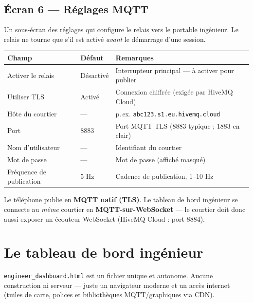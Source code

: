 \documentclass[11pt,a4paper,oneside]{report}
\newcommand{\code}[1]{\texttt{#1}}
\begin{document}
\subsection{Écran 6 --- Réglages MQTT}
Un sous-écran des réglages qui configure le relais vers le portable ingénieur. Le
relais ne tourne que s'il est activé \emph{avant} le démarrage d'une session.

\begin{tabularx}{\linewidth}{@{}llL@{}}
\toprule
\textbf{Champ} & \textbf{Défaut} & \textbf{Remarques}\\
\midrule
Activer le relais & Désactivé & Interrupteur principal --- à activer pour publier\\
Utiliser TLS & Activé & Connexion chiffrée (exigée par HiveMQ Cloud)\\
Hôte du courtier & --- & p.\,ex. \code{abc123.s1.eu.hivemq.cloud}\\
Port & 8883 & Port MQTT TLS (8883 typique ; 1883 en clair)\\
Nom d'utilisateur & --- & Identifiant du courtier\\
Mot de passe & --- & Mot de passe (affiché masqué)\\
Fréquence de publication & 5 Hz & Cadence de publication, 1--10 Hz\\
\bottomrule
\end{tabularx}
\begin{tgnote}
Le téléphone publie en \textbf{MQTT natif (TLS)}. Le tableau de bord ingénieur se
connecte au \emph{même} courtier en \textbf{MQTT-sur-WebSocket} --- le courtier doit
donc aussi exposer un écouteur WebSocket (HiveMQ Cloud : port 8884).
\end{tgnote}

\section{Le tableau de bord ingénieur}
\code{engineer\_dashboard.html} est un fichier unique et autonome. Aucune
construction ni serveur --- juste un navigateur moderne et un accès internet (tuiles
de carte, polices et bibliothèques MQTT/graphiques via CDN).
\end{document}

